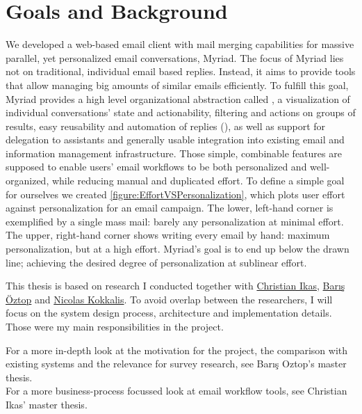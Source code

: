 \section{Goals and Background}

We developed a web-based email client with mail merging capabilities for massive parallel, yet personalized email conversations, Myriad. The focus of Myriad lies not on traditional, individual email based replies. Instead, it aims to provide tools that allow managing big amounts of similar emails efficiently.
To fulfill this goal, Myriad provides a high level organizational abstraction called , a visualization of individual conversations' state and actionability, filtering and actions on groups of results, easy reusability and automation of replies (), as well as support for delegation to assistants and generally usable integration into existing email and information management infrastructure.
Those simple, combinable features are supposed to enable users' email workflows to be both personalized and well-organized, while reducing manual and duplicated effort. To define a simple goal for ourselves we created \autoref{figure:EffortVSPersonalization}, which plots user effort against personalization for an email campaign. The lower, left-hand corner is exemplified by a single mass mail: barely any personalization at minimal effort. The upper, right-hand corner shows writing every email by hand: maximum personalization, but at a high effort. Myriad's goal is to end up below the drawn line; achieving the desired degree of personalization at sublinear effort.


This thesis is based on research I conducted together with \href{mailto:ikas@in.tum.de}{Christian Ikas}, \href{mailto:boztop@gmail.com}{Barış Öztop} and \href{mailto:nicolas@cs.stanford.edu}{Nicolas Kokkalis}. To avoid overlap between the researchers, I will focus on the system design process, architecture and implementation details. Those were my main responsibilities in the project.

For a more in-depth look at the motivation for the project, the comparison with existing systems and the relevance for survey research, see Barış Oztop's master thesis.\\
For a more business-process focussed look at email workflow tools, see Christian Ikas' master thesis.

